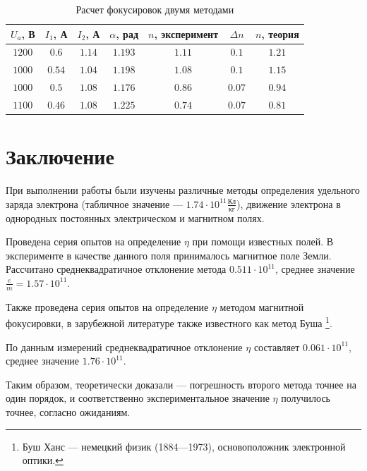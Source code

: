 \begin{table}[ht!]
\begin{center}
\begin{tabular}{|c|c|c|c|c|c|c|}

\hline
$U_a$, В & $I_1$, А & $I_2$, А & $\alpha$, рад & $n$, эксперимент & $\Delta{n}$ & $n$, теория\\
\hline
$1200$ & $0.6$ 	& $1.14$ & $1.193$ 	& $1.11$ & $0.1$  	& $1.21$ \\ \hline
$1000$ & $0.54$ & $1.04$ & $1.198$ 	& $1.08$ & $0.1$ 	& $1.15$ \\ \hline
$1000$ & $0.5$ 	& $1.08$ & $1.176$ 	& $0.86$ & $0.07$  	& $0.94$ \\ \hline
$1100$ & $0.46$ & $1.08$ & $1.225$	& $0.74$ & $0.07$ 	& $0.81$ \\ \hline
\end{tabular}
\end{center}
\caption{\label{tab:n1n2}Расчет фокусировок двумя методами}
\end{table} 


\section*{Заключение}

При выполнении работы были изучены различные методы определения удельного заряда электрона (табличное значение --- $1.74\cdot10^{11}\frac{\text{Кл}}{\text{кг}}$), движение электрона в однородных постоянных электрическом и магнитном полях.

Проведена серия опытов на определение $\eta$ при помощи известных полей. В эксперименте в качестве данного поля принималось магнитное поле Земли. Рассчитано среднеквадратичное отклонение метода $0.511\cdot10^{11}$, среднее значение $\frac{e}{m}=1.57\cdot10^{11}$.

Также проведена серия опытов на определение $\eta$ методом магнитной фокусировки, в зарубежной литературе также известного как метод Буша%
\footnote{Буш Ханс --- немецкий физик (1884—1973), основоположник электронной оптики.}.

По данным измерений среднеквадратичное отклонение $\eta$ составляет  $0.061\cdot10^{11}$, среднее значение $1.76\cdot10^{11}$.

Таким образом, теоретически доказали --- погрешность второго метода точнее на один порядок, и соответственно экспериментальное значение $\eta$ получилось точнее, согласно ожиданиям.

